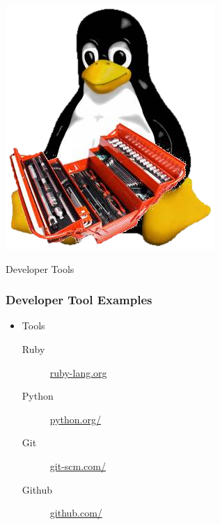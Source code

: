 \documentclass{beamer}
\begin{document}
\begin{frame}
  \begin{center} 
    \includegraphics[height=0.6\textheight]{../img/tux-toolbox}

    \begin{Huge} Developer Tools \end{Huge} 
  \end{center}
\end{frame}

\begin{frame}
  \frametitle{Developer Tool Examples}
  \begin{itemize}
  \item Tools
    \begin{description}
    \item[Ruby] \href{http://ruby-lang.org}{ruby-lang.org}
    \item[Python] \href{http://python.org/}{python.org/}
    \item[Git] \href{http://git-scm.com/}{git-scm.com/}
    \item[Github] \href{http://github.com}{github.com/}
    \end{description}
  \end{itemize}
\end{frame}
\end{document}

